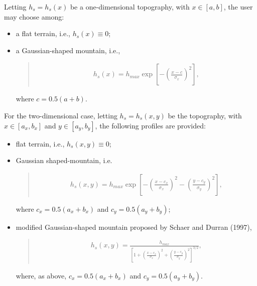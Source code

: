 \documentclass[letterpaper,10pt,english]{sphinxmanual}
\begin{document}
Letting \(h_s = h_s(x)\) be a one-dimensional topography, with \(x \in [a,b]\),
the user may choose among:
\begin{itemize}
\item {} 
a flat terrain, i.e., \(h_s(x) \equiv 0\);

\item {} 
a Gaussian-shaped mountain, i.e.,
\begin{quote}
\begin{equation*}
\begin{split}h_s(x) = h_{max} \exp{\left[ - \left( \frac{x - c}{\sigma_x} \right)^2 \right]},\end{split}
\end{equation*}\end{quote}

where \(c = 0.5 (a + b)\).

\end{itemize}

For the two-dimensional case, letting \(h_s = h_s(x,y)\) be the topography, with
\(x \in [a_x,b_x]\) and \(y \in [a_y,b_y]\), the following profiles are provided:
\begin{itemize}
\item {} 
flat terrain, i.e., \(h_s(x,y) \equiv 0\);

\item {} 
Gaussian shaped-mountain, i.e.
\begin{quote}
\begin{equation*}
\begin{split}h_s(x,y) = h_{max} \exp{\left[ - \left( \frac{x - c_x}{\sigma_x} \right)^2 - \left( \frac{y - c_y}{\sigma_y} \right)^2 \right]} ,\end{split}
\end{equation*}\end{quote}

where \(c_x = 0.5 (a_x + b_x)\) and \(c_y = 0.5 (a_y + b_y)\);

\item {} 
modified Gaussian-shaped mountain proposed by Schaer and Durran (1997),
\begin{quote}
\begin{equation*}
\begin{split}h_s(x,y) = \frac{h_{max}}{\left[ 1 + \left( \frac{x - c_x}{\sigma_x} \right)^2 + \left( \frac{y - c_y}{\sigma_y} \right)^2 \right]^{3/2}},\end{split}
\end{equation*}\end{quote}

where, as above, \(c_x = 0.5 (a_x + b_x)\) and \(c_y = 0.5 (a_y + b_y)\).

\end{itemize}
\end{document}
